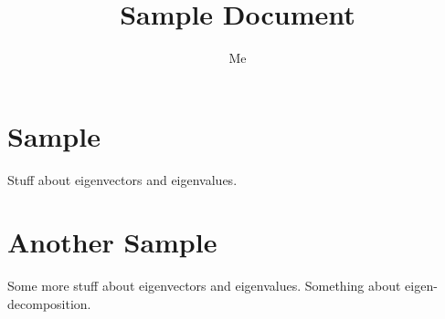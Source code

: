 \documentclass[12pt,oneside]{scrbook}
\title{Sample Document}
\author{Me}
\begin{document}
\maketitle

\chapter{Sample}

Stuff about eigenvectors and
eigenvalues.

\chapter{Another Sample}

Some more stuff about eigenvectors and
eigenvalues. Something about
eigen-decomposition.

\backmatter

\printindex
\end{document}
